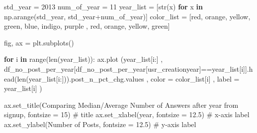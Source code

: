 \documentclass[
  letterpaper,
  DIV=11,
  numbers=noendperiod]{scrartcl}
\newenvironment{Shaded}{\begin{snugshade}}{\end{snugshade}}
\newcommand{\BuiltInTok}[1]{\textcolor[rgb]{0.00,0.23,0.31}{#1}}
\newcommand{\CommentTok}[1]{\textcolor[rgb]{0.37,0.37,0.37}{#1}}
\newcommand{\ControlFlowTok}[1]{\textcolor[rgb]{0.00,0.23,0.31}{\textbf{#1}}}
\newcommand{\DecValTok}[1]{\textcolor[rgb]{0.68,0.00,0.00}{#1}}
\newcommand{\FloatTok}[1]{\textcolor[rgb]{0.68,0.00,0.00}{#1}}
\newcommand{\KeywordTok}[1]{\textcolor[rgb]{0.00,0.23,0.31}{\textbf{#1}}}
\newcommand{\NormalTok}[1]{\textcolor[rgb]{0.00,0.23,0.31}{#1}}
\newcommand{\OperatorTok}[1]{\textcolor[rgb]{0.37,0.37,0.37}{#1}}
\newcommand{\StringTok}[1]{\textcolor[rgb]{0.13,0.47,0.30}{#1}}
\begin{document}
\begin{Shaded}
\begin{Highlighting}[]
\NormalTok{std\_year }\OperatorTok{=} \DecValTok{2013}
\NormalTok{num\_of\_year }\OperatorTok{=} \DecValTok{11}
\NormalTok{year\_list }\OperatorTok{=}\NormalTok{ [}\BuiltInTok{str}\NormalTok{(x) }\ControlFlowTok{for}\NormalTok{ x }\KeywordTok{in}\NormalTok{ np.arange(std\_year, std\_year}\OperatorTok{+}\NormalTok{num\_of\_year)]}
\NormalTok{color\_list }\OperatorTok{=}\NormalTok{ [}\StringTok{\textquotesingle{}red\textquotesingle{}}\NormalTok{, }\StringTok{\textquotesingle{}orange\textquotesingle{}}\NormalTok{, }\StringTok{\textquotesingle{}yellow\textquotesingle{}}\NormalTok{, }\StringTok{\textquotesingle{}green\textquotesingle{}}\NormalTok{, }\StringTok{\textquotesingle{}blue\textquotesingle{}}\NormalTok{, }\StringTok{\textquotesingle{}indigo\textquotesingle{}}\NormalTok{, }\StringTok{\textquotesingle{}purple\textquotesingle{}}
\NormalTok{            , }\StringTok{\textquotesingle{}red\textquotesingle{}}\NormalTok{, }\StringTok{\textquotesingle{}orange\textquotesingle{}}\NormalTok{, }\StringTok{\textquotesingle{}yellow\textquotesingle{}}\NormalTok{, }\StringTok{\textquotesingle{}green\textquotesingle{}}\NormalTok{]}

\NormalTok{fig, ax }\OperatorTok{=}\NormalTok{ plt.subplots()}

\ControlFlowTok{for}\NormalTok{ i }\KeywordTok{in} \BuiltInTok{range}\NormalTok{(}\BuiltInTok{len}\NormalTok{(year\_list)):   }
\NormalTok{        ax.plot (year\_list[i:]}
\NormalTok{        , df\_no\_post\_per\_year[df\_no\_post\_per\_year[}\StringTok{\textquotesingle{}usr\_creationyear\textquotesingle{}}\NormalTok{]}\OperatorTok{==}\NormalTok{year\_list[i]].head(}\BuiltInTok{len}\NormalTok{(year\_list[i:])).post\_n\_pct\_chg.values}
\NormalTok{        ,  color }\OperatorTok{=}\NormalTok{ color\_list[i]}
\NormalTok{        ,  label }\OperatorTok{=}\NormalTok{ year\_list[i]}
\NormalTok{        ) }


\NormalTok{ax.set\_title(}\StringTok{\textquotesingle{}Comparing Median/Average Number of Answers after year from signup\textquotesingle{}}\NormalTok{, fontsize }\OperatorTok{=} \DecValTok{15}\NormalTok{) }\CommentTok{\# title}
\NormalTok{ax.set\_xlabel(}\StringTok{\textquotesingle{}year\textquotesingle{}}\NormalTok{, fontsize }\OperatorTok{=} \FloatTok{12.5}\NormalTok{) }\CommentTok{\# x{-}axis label}
\NormalTok{ax.set\_ylabel(}\StringTok{\textquotesingle{}Number of Posts\textquotesingle{}}\NormalTok{, fontsize }\OperatorTok{=} \FloatTok{12.5}\NormalTok{) }\CommentTok{\# y{-}axis label}


\end{Highlighting}
\end{Shaded}
\end{document}
